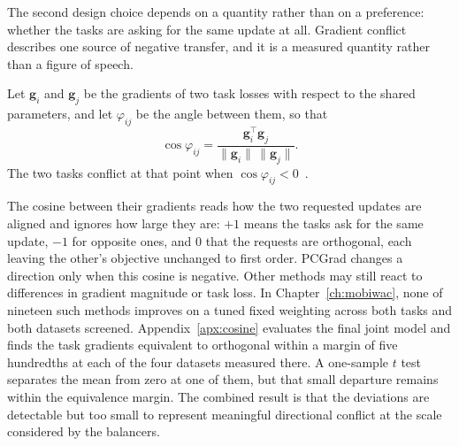 The second design choice depends on a quantity rather than on a preference: whether the
tasks are asking for the same update at all. Gradient conflict describes one source of
negative transfer, and it is a measured quantity rather than a figure of speech.

\begin{definition}\label{def:fund:conflict}
    Let $\mathbf{g}_i$ and $\mathbf{g}_j$ be the gradients of two task losses with respect
    to the shared parameters, and let $\varphi_{ij}$ be the angle between them, so that
    \begin{equation}\label{eq:fund:cosine}
        \cos\varphi_{ij}
        = \frac{\mathbf{g}_i^{\top}\mathbf{g}_j}
        {\lVert \mathbf{g}_i\rVert\,\lVert \mathbf{g}_j\rVert}.
    \end{equation}
    The two tasks conflict at that point when $\cos\varphi_{ij}<0$~\cite{yu2020pcgrad}.
\end{definition}

The cosine between their gradients reads how the two requested updates are aligned and
ignores how large they are: $+1$ means the tasks ask for the same update, $-1$ for
opposite ones, and $0$ that the requests are orthogonal, each leaving the other's
objective unchanged to first order. PCGrad changes a direction only when this cosine is
negative. Other methods may still react to differences in gradient magnitude or task
loss. In Chapter~\ref{ch:mobiwac}, none of nineteen such methods improves on a tuned fixed
weighting across both tasks and both datasets screened. Appendix~\ref{apx:cosine} evaluates the final joint
model and finds the task gradients equivalent to orthogonal within a margin of five
hundredths at each of the four datasets measured there. A one-sample $t$ test separates the mean
from zero at one of them, but that small departure remains within the equivalence margin.
The combined result is that the deviations are detectable but too small to represent
meaningful directional conflict at the scale considered by the balancers.

